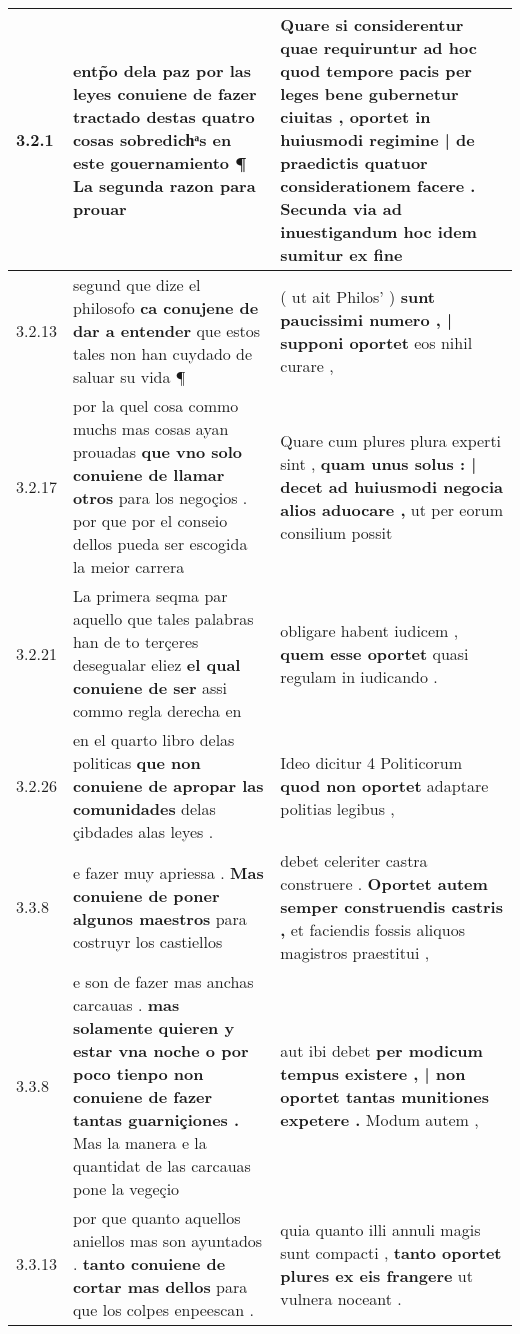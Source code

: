 \begin{tabular}{|p{1cm}|p{6.5cm}|p{6.5cm}|}
3.2.1 & entp̃o dela paz \textbf{ por las leyes conuiene de fazer tractado destas quatro cosas sobredichͣs en este gouernamiento ¶ } La segunda razon para prouar & Quare si considerentur quae requiruntur ad hoc quod tempore pacis per leges bene gubernetur ciuitas , \textbf{ oportet in huiusmodi regimine | de praedictis quatuor considerationem facere . } Secunda via ad inuestigandum hoc idem sumitur ex fine \\\hline
3.2.13 & segund que dize el philosofo \textbf{ ca conujene de dar a entender } que estos tales non han cuydado de saluar su vida ¶ & ( ut ait Philos’ ) \textbf{ sunt paucissimi numero , | supponi oportet } eos nihil curare , \\\hline
3.2.17 & por la quel cosa commo muchs mas cosas ayan prouadas \textbf{ que vno solo conuiene de llamar otros } para los negoçios . por que por el conseio dellos pueda ser escogida la meior carrera & Quare cum plures plura experti sint , \textbf{ quam unus solus : | decet ad huiusmodi negocia alios aduocare , } ut per eorum consilium possit \\\hline
3.2.21 & La primera seqma par aquello que tales palabras han de to terçeres desegualar eliez \textbf{ el qual conuiene de ser } assi commo regla derecha en & obligare habent iudicem , \textbf{ quem esse oportet } quasi regulam in iudicando . \\\hline
3.2.26 & en el quarto libro delas politicas \textbf{ que non conuiene de apropar las comunidades } delas çibdades alas leyes . & Ideo dicitur 4 Politicorum \textbf{ quod non oportet } adaptare politias legibus , \\\hline
3.3.8 & e fazer muy apriessa . \textbf{ Mas conuiene de poner algunos maestros } para costruyr los castiellos & debet celeriter castra construere . \textbf{ Oportet autem semper construendis castris , } et faciendis fossis aliquos magistros praestitui , \\\hline
3.3.8 & e son de fazer mas anchas carcauas . \textbf{ mas solamente quieren y estar vna noche o por poco tienpo non conuiene de fazer tantas guarniçiones . } Mas la manera e la quantidat de las carcauas pone la vegeçio & aut ibi debet \textbf{ per modicum tempus existere , | non oportet tantas munitiones expetere . } Modum autem , \\\hline
3.3.13 & por que quanto aquellos aniellos mas son ayuntados . \textbf{ tanto conuiene de cortar mas dellos } para que los colpes enpeescan . & quia quanto illi annuli magis sunt compacti , \textbf{ tanto oportet plures ex eis frangere } ut vulnera noceant . \\\hline

\end{tabular}
